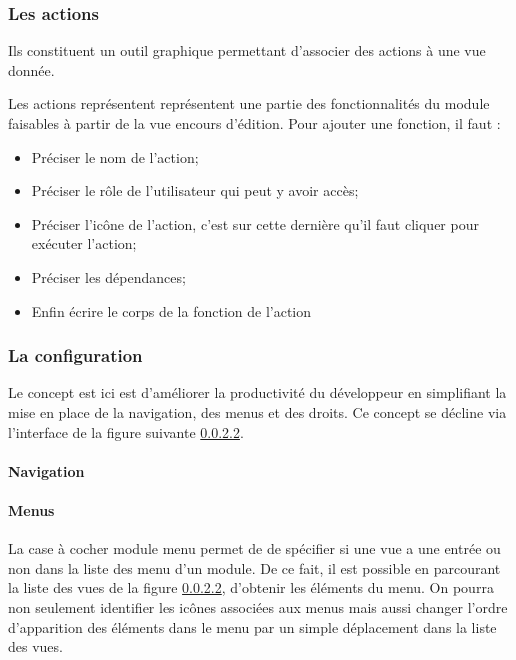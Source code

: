 \documentclass[a4paper,12pt]{article}
\begin{document}

\subsubsection{ Les actions}

Ils constituent un outil graphique permettant d'associer des actions
à une vue donnée.


Les actions représentent représentent une partie des fonctionnalités
du module faisables à partir de la vue encours d'édition.  Pour
ajouter une fonction, il faut :
\begin{itemize}
\item Préciser le nom de l'action;
\item  Préciser le rôle de l'utilisateur qui peut y avoir accès;
\item Préciser l'icône  de l'action, c'est sur cette dernière qu'il faut cliquer pour exécuter l'action;
\item Préciser les dépendances;
\item Enfin écrire le corps de la fonction de l'action
\end{itemize}

 

\subsubsection{ La configuration} 
Le  concept est ici est d'améliorer la productivité du développeur en
simplifiant la mise en place de la navigation, des menus et des droits.
 Ce concept se décline via l'interface de la figure suivante \ref{}.

\paragraph{Navigation}


\paragraph{Menus}
La case à cocher \og module menu \fg permet de de spécifier si une vue
a une entrée ou non dans la liste des menu d'un module.  De ce fait,
il est possible en parcourant la liste des vues de la figure \ref{},
d'obtenir les éléments du menu. On pourra non seulement identifier
les icônes associées aux menus mais aussi changer l'ordre d'apparition
des éléments dans le menu par un simple déplacement dans la liste des vues.
 
\end{document}
